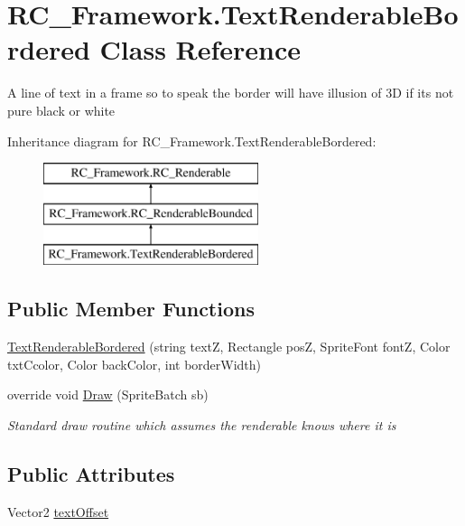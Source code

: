 \hypertarget{class_r_c___framework_1_1_text_renderable_bordered}{}\section{R\+C\+\_\+\+Framework.\+Text\+Renderable\+Bordered Class Reference}
\label{class_r_c___framework_1_1_text_renderable_bordered}


A line of text in a frame so to speak the border will have illusion of 3D if its not pure black or white  


Inheritance diagram for R\+C\+\_\+\+Framework.\+Text\+Renderable\+Bordered\+:\begin{figure}[H]
\begin{center}
\leavevmode
\includegraphics[height=3.000000cm]{class_r_c___framework_1_1_text_renderable_bordered}
\end{center}
\end{figure}
\subsection*{Public Member Functions}
\begin{DoxyCompactItemize}
\item 
\mbox{\hyperlink{class_r_c___framework_1_1_text_renderable_bordered_a14199b2a8d6f25b9e77ceaf11cb17477}{Text\+Renderable\+Bordered}} (string textZ, Rectangle posZ, Sprite\+Font fontZ, Color txt\+Ccolor, Color back\+Color, int border\+Width)
\item 
override void \mbox{\hyperlink{class_r_c___framework_1_1_text_renderable_bordered_a3242eaa3191281834da585239048f8ce}{Draw}} (Sprite\+Batch sb)
\begin{DoxyCompactList}\small\item\em Standard draw routine which assumes the renderable knows where it is \end{DoxyCompactList}\end{DoxyCompactItemize}
\subsection*{Public Attributes}
\begin{DoxyCompactItemize}
\item 
Vector2 \mbox{\hyperlink{class_r_c___framework_1_1_text_renderable_bordered_a9503f8c0678a9ae0376fa9942afe5e8b}{text\+Offset}}
\end{DoxyCompactItemize}
